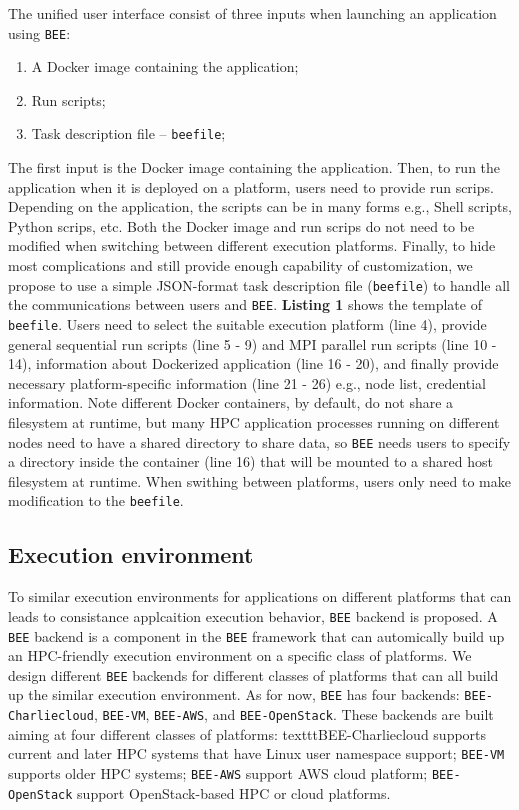 The unified user interface consist of three inputs when launching an application using \texttt{BEE}:
\begin{enumerate}
\item A Docker image containing the application;
\item Run scripts;
\item Task description file -- \texttt{beefile};

\end{enumerate}
The first input is the Docker image containing the application. Then, to run the application when it is deployed on a platform, users need to provide run scrips. Depending on the application, the scripts can be in many forms e.g., Shell scripts, Python scrips, etc. Both the Docker image and run scrips do not need to be modified when switching between different execution platforms. Finally, to hide most complications and still provide enough capability of customization, we propose to use a simple JSON-format task description file (\texttt{beefile}) to handle all the communications between users and \texttt{BEE}. \textbf{Listing 1} shows the template of \texttt{beefile}. Users need to select the suitable execution platform (line 4), provide general sequential run scripts (line 5 - 9) and MPI parallel run scripts (line 10 - 14), information about Dockerized  application (line 16 - 20), and finally provide necessary platform-specific information (line 21 - 26) e.g., node list, credential information. Note different Docker containers, by default, do not share a filesystem at runtime, but many HPC application processes running on different nodes need to have a shared directory to share data, so \texttt{BEE} needs users to specify a directory inside the container (line 16) that will be mounted to a shared host filesystem at runtime. When swithing between platforms, users only need to make modification to the \texttt{beefile}.

\subsection{Execution environment}
To similar execution environments for applications on different platforms that can leads to consistance applcaition execution behavior, \texttt{BEE} backend is proposed. A \texttt{BEE} backend is a component in the \texttt{BEE} framework that can automically build up an HPC-friendly execution environment on a specific class of platforms. We design different \texttt{BEE} backends for different classes of platforms that can all build up the similar execution environment. As for now, \texttt{BEE} has four backends: \texttt{BEE-Charliecloud}, \texttt{BEE-VM}, \texttt{BEE-AWS}, and \texttt{BEE-OpenStack}. These backends are built aiming at four different classes of platforms: texttt{BEE-Charliecloud} supports current and later HPC systems that have Linux user namespace support; \texttt{BEE-VM} supports older HPC systems; \texttt{BEE-AWS} support AWS cloud platform; \texttt{BEE-OpenStack} support OpenStack-based HPC or cloud platforms.

